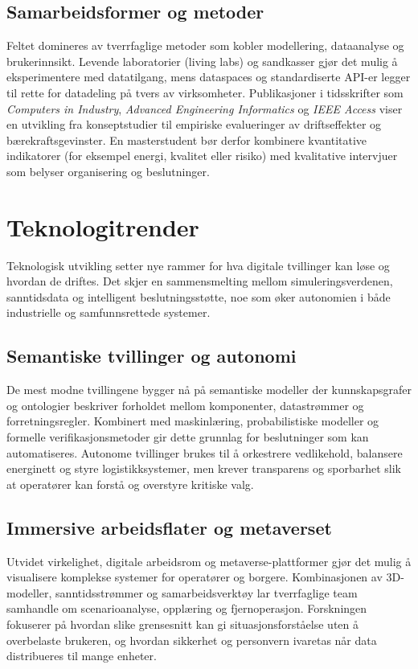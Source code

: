 \subsection{Samarbeidsformer og metoder}
Feltet domineres av tverrfaglige metoder som kobler modellering, dataanalyse og brukerinnsikt. Levende laboratorier (living labs) og sandkasser gjør det mulig å eksperimentere med datatilgang, mens dataspaces og standardiserte API-er legger til rette for datadeling på tvers av virksomheter. Publikasjoner i tidsskrifter som \emph{Computers in Industry}, \emph{Advanced Engineering Informatics} og \emph{IEEE Access} viser en utvikling fra konseptstudier til empiriske evalueringer av driftseffekter og bærekraftsgevinster. En masterstudent bør derfor kombinere kvantitative indikatorer (for eksempel energi, kvalitet eller risiko) med kvalitative intervjuer som belyser organisering og beslutninger.

\section{Teknologitrender}
Teknologisk utvikling setter nye rammer for hva digitale tvillinger kan løse og hvordan de driftes. Det skjer en sammensmelting mellom simuleringsverdenen, sanntidsdata og intelligent beslutningsstøtte, noe som øker autonomien i både industrielle og samfunnsrettede systemer.

\subsection{Semantiske tvillinger og autonomi}
De mest modne tvillingene bygger nå på semantiske modeller der kunnskapsgrafer og ontologier beskriver forholdet mellom komponenter, datastrømmer og forretningsregler. Kombinert med maskinlæring, probabilistiske modeller og formelle verifikasjonsmetoder gir dette grunnlag for beslutninger som kan automatiseres. Autonome tvillinger brukes til å orkestrere vedlikehold, balansere energinett og styre logistikksystemer, men krever transparens og sporbarhet slik at operatører kan forstå og overstyre kritiske valg.

\subsection{Immersive arbeidsflater og metaverset}
Utvidet virkelighet, digitale arbeidsrom og metaverse-plattformer gjør det mulig å visualisere komplekse systemer for operatører og borgere. Kombinasjonen av 3D-modeller, sanntidsstrømmer og samarbeidsverktøy lar tverrfaglige team samhandle om scenarioanalyse, opplæring og fjernoperasjon. Forskningen fokuserer på hvordan slike grensesnitt kan gi situasjonsforståelse uten å overbelaste brukeren, og hvordan sikkerhet og personvern ivaretas når data distribueres til mange enheter.

